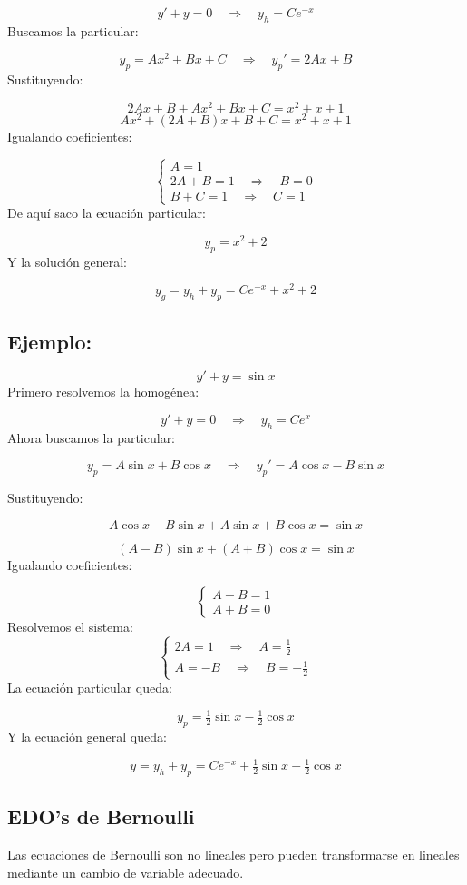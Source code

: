 \documentclass[a4paper,12pt]{article}
\begin{document}
\[
y' + y = 0 \quad \Rightarrow \quad y_h = C e^{-x}
\]
Buscamos la particular:

\[
y_p = Ax^2 + Bx + C \quad \Rightarrow \quad y_p' = 2Ax + B
\]
Sustituyendo:

\[
2Ax + B + A x^2 + Bx + C = x^2 + x + 1
\]
\[
A x^2 + (2A + B)x + B + C = x^2 + x + 1
\]
Igualando coeficientes:

\[
\begin{cases}
A = 1\\ 
2A + B = 1 \quad \Rightarrow \quad B = 0\\ 
B + C = 1 \quad \Rightarrow \quad C = 1
\end{cases}
\]
De aquí saco la ecuación particular:

\[
y_p = x^2 + 2
\]
Y la solución general:

\[
y_g = y_h + y_p = C e^{-x} + x^2 + 2
\]
\subsection*{Ejemplo:}
\vspace{-1.2em}
\[
y' + y = \sin x
\]
Primero resolvemos la homogénea:

\[
y' + y = 0 \quad \Rightarrow \quad y_h = C e^{x}
\]
Ahora buscamos la particular:

\[
y_p = A \sin x + B \cos x
\quad \Rightarrow \quad
y_p' = A \cos x - B \sin x
\]

\newpage
\noindent
Sustituyendo:

\[
A \cos x - B \sin x + A \sin x + B \cos x = \sin x
\]

\[
(A - B) \sin x + (A + B) \cos x = \sin x
\]
Igualando coeficientes:

\[
\begin{cases}
A - B = 1 \\[4pt]
A + B = 0
\end{cases}
\]
Resolvemos el sistema:
\[
\begin{cases}
2A = 1 \quad \Rightarrow \quad A = \frac{1}{2} \\[4pt]
A = -B \quad \Rightarrow \quad B = -\frac{1}{2}
\end{cases}
\]
La ecuación particular queda:

\[
y_p = \tfrac{1}{2}\sin x - \tfrac{1}{2}\cos x
\]
Y la ecuación general queda:

\[
y = y_h + y_p = C e^{-x} + \tfrac{1}{2}\sin x - \tfrac{1}{2}\cos x
\]

\subsection{EDO's de Bernoulli}
\noindent
Las ecuaciones de Bernoulli son no lineales pero pueden transformarse en 
lineales mediante un cambio de variable adecuado.
\end{document}
